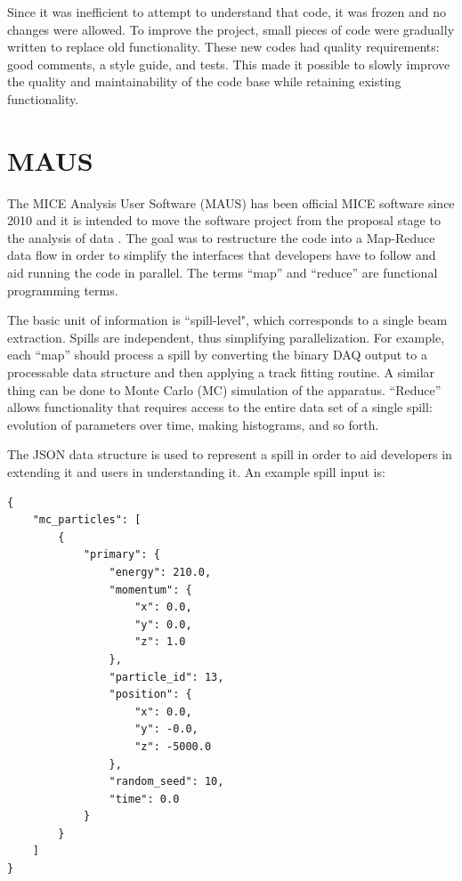 \documentclass{JAC2003}
\begin{document}
Since it was inefficient to attempt to understand that code, it was frozen and no changes were allowed. To improve the project, small pieces of code were gradually written to replace old functionality.  These new codes had quality requirements: good comments, a style guide, and tests.  This made it possible to slowly improve the quality and maintainability of the code base while retaining existing functionality.

\section{MAUS}

The MICE  Analysis User Software (MAUS) has been official MICE  software since 2010 and it is intended to move the software project from the proposal stage to the analysis of data \cite{maus}.  The goal was to restructure the code into a Map-Reduce \cite{mapreduce} data flow in order to simplify the interfaces that developers have to follow and aid running the code in parallel.  The terms ``map'' and ``reduce'' are functional programming terms.

The basic unit of information is ``spill-level", which corresponds to a single beam extraction.  Spills are independent, thus simplifying parallelization.   For example, each ``map'' should process a spill by converting the binary DAQ output to a processable data structure and then applying a track fitting routine.  A similar thing can be done to Monte Carlo (MC) simulation of the apparatus.  ``Reduce'' allows functionality that requires access to the entire data set of a single spill: evolution of parameters over time, making histograms, and so forth.

The JSON data structure is used to represent a spill in order to aid developers in extending it and users in understanding it.  An example spill input is:

\begin{verbatim}
{
    "mc_particles": [
        {
            "primary": {
                "energy": 210.0, 
                "momentum": {
                    "x": 0.0, 
                    "y": 0.0, 
                    "z": 1.0
                }, 
                "particle_id": 13, 
                "position": {
                    "x": 0.0, 
                    "y": -0.0, 
                    "z": -5000.0
                }, 
                "random_seed": 10, 
                "time": 0.0
            }
        }
    ]
}
\end{verbatim}
\end{document}
